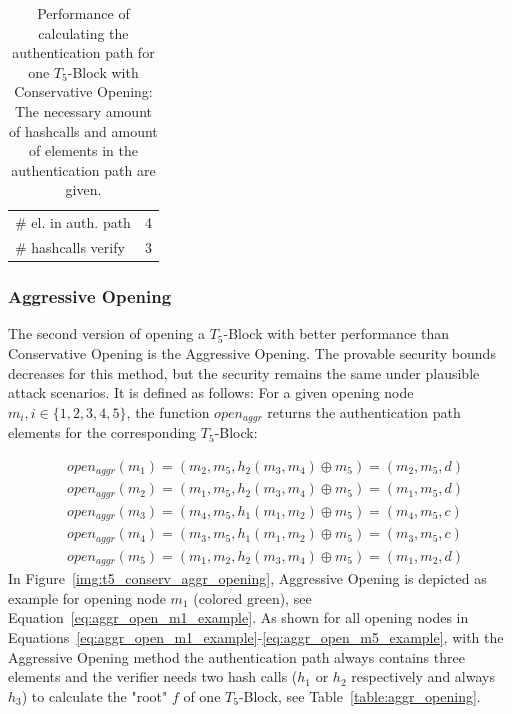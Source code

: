 \begin{table}
\centering
\begin{tabular}{l c} 
 \hline\noalign{\smallskip}
 \multicolumn{2}{c}{\textbf{Conservative Opening}} \\
 \hline\noalign{\smallskip}
 \# el. in auth. path & 4 \\
  \# hashcalls verify & 3 \\
 \hline
\end{tabular}
\caption{Performance of calculating the authentication path for one $T_5$-Block with Conservative Opening: The necessary amount of hashcalls and amount of elements in the authentication path are given.}
\label{table:conserv_opening}
\end{table}

\subsubsection{Aggressive Opening}
\label{sec:aggr_opening}
The second version of opening a $T_5$-Block with better performance than Conservative Opening is the Aggressive Opening. The provable security bounds decreases for this method, but the security remains the same under plausible attack scenarios. It is defined as follows: For a given opening node $m_i, i \in \{1,2,3,4,5\}$, the function $open_{aggr}$ returns the authentication path elements for the corresponding $T_5$-Block:

\begin{align}
&open_{aggr}(m_1) = (m_2, m_5, h_2(m_3,m_4) \oplus m_5) = (m_2, m_5, d) \label{eq:aggr_open_m1_example} \\
&open_{aggr}(m_2) = (m_1, m_5, h_2(m_3,m_4) \oplus m_5) = (m_1, m_5, d) \\
&open_{aggr}(m_3) = (m_4, m_5, h_1(m_1, m_2) \oplus m_5) = (m_4, m_5, c) \\ 
&open_{aggr}(m_4) = (m_3, m_5, h_1(m_1, m_2) \oplus m_5) = (m_3, m_5, c) \\ 
&open_{aggr}(m_5) = (m_1, m_2, h_2(m_3, m_4) \oplus m_5) = (m_1, m_2, d) \label{eq:aggr_open_m5_example}
\end{align}
In Figure~\ref{img:t5_conserv_aggr_opening}, Aggressive Opening is depicted as example for opening node $m_1$ (colored green), see Equation~\ref{eq:aggr_open_m1_example}. 
As shown for all opening nodes in Equations~\ref{eq:aggr_open_m1_example}-\ref{eq:aggr_open_m5_example}, with the Aggressive Opening method the authentication path always contains three elements and the verifier needs two hash calls ($h_1$ or $h_2$ respectively and always $h_3$) to calculate the "root" $f$ of one $T_5$-Block, see Table~\ref{table:aggr_opening}.

